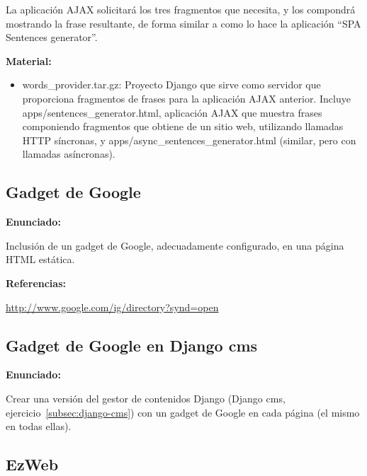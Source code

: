 La aplicación AJAX solicitará los tres fragmentos que necesita, y los compondrá mostrando la frase resultante, de forma similar a como lo hace la aplicación ``SPA Sentences generator''.

\textbf{Material:}

\begin{itemize}
\item words\_provider.tar.gz: Proyecto Django que sirve como servidor que proporciona fragmentos de frases para la aplicación AJAX anterior. Incluye apps/sentences\_generator.html, aplicación AJAX que muestra frases componiendo fragmentos que obtiene de un sitio web, utilizando llamadas HTTP síncronas, y apps/async\_sentences\_generator.html (similar, pero con llamadas asíncronas).
\end{itemize}

\subsection{Gadget de Google}
\label{subsec:gadget-google}

\textbf{Enunciado:}

Inclusión de un gadget de Google, adecuadamente configurado, en una página HTML estática.

\textbf{Referencias:}

\url{http://www.google.com/ig/directory?synd=open}

\subsection{Gadget de Google en Django cms}
\label{subsec:gadget-google-cms}

\textbf{Enunciado:}

Crear una versión del gestor de contenidos Django (Django cms, ejercicio~\ref{subsec:django-cms}) con un gadget de Google en cada página (el mismo en todas ellas).

\subsection{EzWeb}
\label{subsec:ezweb}


